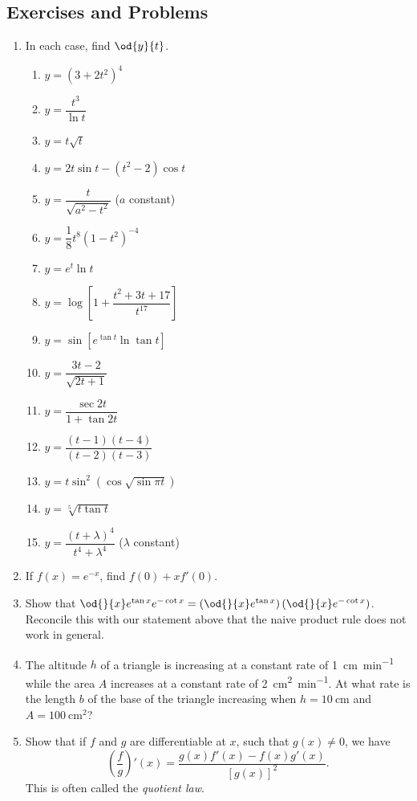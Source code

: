 \subsection{Exercises and Problems}
\begin{enumerate}
  \item In each case, find $ \od{y}{t} $.
    \begin{multicols}{2}
    \begin{enumerate}
      \item $ y = \left(3 + 2t^2\right)^4 $
      \item $ y = \dfrac{t^3}{\ln t} $
      \item $ y = t\sqrt{t} $
      \item $ y = 2t \sin t - (t^2 - 2) \cos t $
      \item $ y = \dfrac{t}{\sqrt{a^2 - t^2}} $ ($ a $ constant)
      \item $ y = \dfrac{1}{8} t^8 \left(1 - t^2\right)^{-4} $
      \item $ y = e^t \ln t $
      \item $ y = \log \left[1 + \dfrac{t^2 + 3t + 17}{t^{17}}\right] $
      \item $ y = \sin \left[e^{\tan t} \ln \tan t\right] $
      \item $ y = \dfrac{3t - 2}{\sqrt{2t + 1}} $
      \item $ y = \dfrac{\sec 2t}{1 + \tan 2t} $
      \item $ y = \dfrac{(t - 1)(t - 4)}{(t - 2)(t - 3)} $
      \item $ y = t \sin^2(\cos \sqrt{\sin \pi t}) $
      \item $ y = \sqrt[5]{t \tan t} $
      \item $ y = \dfrac{(t + \lambda)^4}{t^4 + \lambda^4} $ ($\lambda $ constant)
    \end{enumerate}
    \end{multicols}
  \item If $ f(x) = e^{-x} $, find $ f(0) + xf'(0) $.
  \item Show that $ \od{}{x} e^{\tan x} e^{-\cot x} = \left(\od{}{x}e^{\tan x}\right)\left(\od{}{x}e^{-\cot x}\right) $. Reconcile
        this with our statement above that the naive product rule does not work in general.
  \item The altitude $ h $ of a triangle is increasing at a constant rate of \SI{1}{\centi\metre\per\minute} while
        the area $ A $ increases at a constant rate of \SI{2}{\centi\metre\squared\per\minute}. At what rate
        is the length $ b $ of the base of the triangle increasing when $ h = \SI{10}{\centi\metre} $ and $ A = \SI{100}{\centi\metre\squared} $?
  \item Show that if $ f $ and $ g $ are differentiable at $ x $, such that $ g(x) \neq 0 $, we have
        \begin{displaymath}
          \left( \frac{f}{g} \right)'(x) = \frac{g(x)f'(x) - f(x)g'(x)}{[g(x)]^2}.
        \end{displaymath}
        This is often called the \emph{quotient law}.


\end{enumerate}
